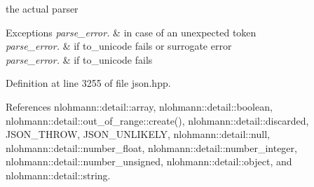the actual parser 


\begin{DoxyExceptions}{Exceptions}
{\em parse\+\_\+error.} & in case of an unexpected token \\
\hline
{\em parse\+\_\+error.} & if to\+\_\+unicode fails or surrogate error \\
\hline
{\em parse\+\_\+error.} & if to\+\_\+unicode fails \\
\hline
\end{DoxyExceptions}


Definition at line 3255 of file json.\+hpp.



References nlohmann\+::detail\+::array, nlohmann\+::detail\+::boolean, nlohmann\+::detail\+::out\+\_\+of\+\_\+range\+::create(), nlohmann\+::detail\+::discarded, J\+S\+O\+N\+\_\+\+T\+H\+R\+OW, J\+S\+O\+N\+\_\+\+U\+N\+L\+I\+K\+E\+LY, nlohmann\+::detail\+::null, nlohmann\+::detail\+::number\+\_\+float, nlohmann\+::detail\+::number\+\_\+integer, nlohmann\+::detail\+::number\+\_\+unsigned, nlohmann\+::detail\+::object, and nlohmann\+::detail\+::string.


